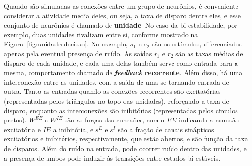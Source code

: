 Quando são simuladas as conexões entre um grupo de neurônios, é conveniente considerar a atividade média deles, ou seja, a taxa de disparo dentre eles, e esse conjunto de neurônios é chamado de \textbf{unidade}. No caso da bi-estabilidade, por exemplo, duas unidades rivalizam entre si, conforme mostrado na Figura~\ref{fig:unidadesdecisao}. No exemplo, $s_1$ e $s_2$ são os estímulos, diferenciados apenas pela eventual presença de ruído. As saídas $r_1$ e $r_2$ são as taxas médias de disparo de cada unidade, e cada uma delas também serve como entrada para a mesma, comportamento chamado de \textbf{\textit{feedback} recorrente}. Além disso, há uma interconexão entre as unidades, com a saída de uma se tornando entrada de outra. Tanto as entradas quando as conexões recorrentes são excitatórias (representadas pelos triângulos no topo das unidades), reforçando a taxa de disparo, enquanto as interconexões são inibitórias (representadas pelos círculos pretos). $W^{EE}$ e $W^{IE}$ são as forças das conexões, com o $EE$ indicando a conexão excitatória e $IE$ a inibitória, e $s^E$ e $s^I$ são a fração de canais sinápticos excitatórios e inibitórios, respectivamente, que estão abertos, e são função da taxa de disparos. Além do ruído na entrada, pode ocorrer ruído dentro das unidades, e a presença de ambos pode induzir às transições entre estados bi-estáveis.


